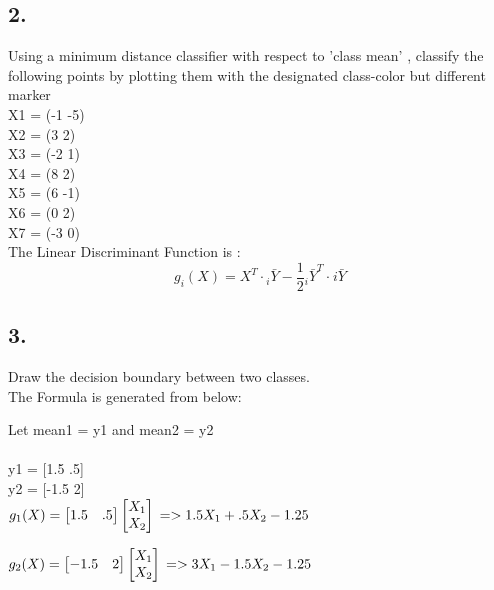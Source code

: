 \documentclass[12pt]{article}
\begin{document}
\subsection *{2.}
Using a minimum distance classifier with respect to 'class mean' , classify the following points by plotting them with the designated class-color but different marker\\
X1 = (-1 -5)\\
X2 = (3 2)\\
X3 = (-2 1)\\
X4 = (8 2)\\
X5 = (6 -1)\\
X6 = (0 2)\\
X7 = (-3 0)\\
The Linear Discriminant Function is :\\
\begin{equation*}
 g_i(X) = X^T\cdot {}_i\bar{Y}- \frac{1}{2} {}_i  \bar{Y}^T\cdot_{}i\bar{Y}
\end{equation*}

\subsection *{3.}
Draw the decision boundary between two  classes.\\
The Formula is generated from below:

Let mean1 = y1 and mean2 = y2\\\\
y1 = [1.5 .5]\\
y2 = [-1.5 2]\\

$g_1(X) = \begin{bmatrix}
1.5 & .5
\end{bmatrix}
 \begin{bmatrix}
X_1\\X_2
\end{bmatrix}\\\\
=>1.5X_1 + .5X_2 -1.25\\\\$

$g_2(X) = \begin{bmatrix}
-1.5 & 2
\end{bmatrix}
 \begin{bmatrix}
X_1\\X_2
\end{bmatrix}\\\\
=>3X_1 -1.5X_2 -1.25\\\\$
\end{document}
